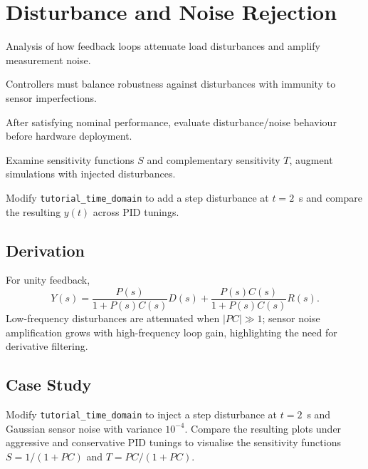 \section{Disturbance and Noise Rejection}
\begin{beginnerguide}
    \item[\textbf{What?}] Analysis of how feedback loops attenuate load disturbances and amplify measurement noise.
    \item[\textbf{Why?}] Controllers must balance robustness against disturbances with immunity to sensor imperfections.
    \item[\textbf{When?}] After satisfying nominal performance, evaluate disturbance/noise behaviour before hardware deployment.
    \item[\textbf{How?}] Examine sensitivity functions $S$ and complementary sensitivity $T$, augment simulations with injected disturbances.
    \item[\textbf{Example}] Modify \texttt{tutorial\_time\_domain} to add a step disturbance at $t=2$~s and compare the resulting $y(t)$ across PID tunings.
\end{beginnerguide}
\subsection{Derivation}
For unity feedback,
\[
    Y(s) = \frac{P(s)}{1 + P(s) C(s)} D(s) + \frac{P(s) C(s)}{1 + P(s) C(s)} R(s).
\]
Low-frequency disturbances are attenuated when $|PC| \gg 1$; sensor noise amplification grows with high-frequency loop gain, highlighting the need for derivative filtering.

\subsection{Case Study}
Modify \texttt{tutorial\_time\_domain} to inject a step disturbance at $t=2$~s and Gaussian sensor noise with variance $10^{-4}$. Compare the resulting plots under aggressive and conservative PID tunings to visualise the sensitivity functions $S = 1/(1+PC)$ and $T = PC/(1+PC)$.


